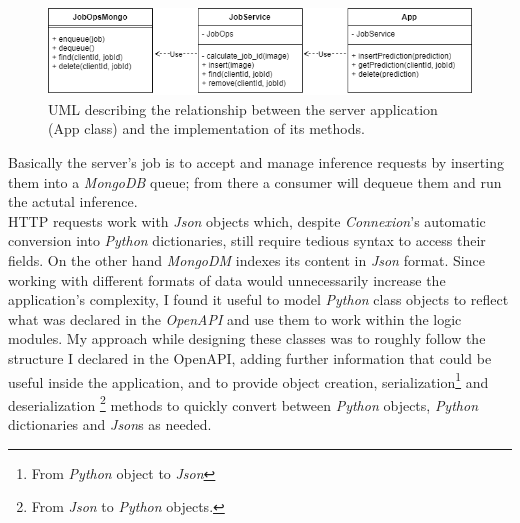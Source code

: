 \begin{figure}[htbp]
\begin{center}
\includegraphics[width=\textwidth]{immagini/pictures/jobops.png} 
\caption{UML describing the relationship between the server application (App class) and the implementation of its methods.}
\end{center}
\end{figure}

Basically the server's job is to accept and manage inference requests by inserting them into a \emph{MongoDB} queue; from there a consumer will dequeue them and run the actutal inference. \\
HTTP requests work with \emph{Json} objects which, despite \emph{Connexion}'s automatic conversion into \emph{Python} dictionaries, still require tedious syntax to access their fields. On the other hand \emph{MongoDM} indexes its content in \emph{Json} format.
Since working with different formats of data would unnecessarily increase the application's complexity, I found it useful to model \emph{Python} class objects to reflect what was declared in the \emph{OpenAPI} and use them to work within the logic modules. My approach while designing these classes was to roughly follow the structure I declared in the OpenAPI, adding further information that could be useful inside the application, and to provide object creation, serialization\footnote{From \emph{Python} object to \emph{Json}} and deserialization \footnote{From \emph{Json} to \emph{Python} objects.} methods to quickly convert between  \emph{Python} objects, \emph{Python} dictionaries and \emph{Json}s as needed. \\

